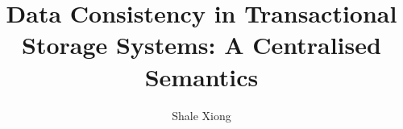 \documentclass[a4paper,UKenglish,cleveref,autoref,thm-restate,authorcolumns,anonymous]{lipics-v2019}
\title{%
Data Consistency in Transactional Storage Systems: 
A Centralised Semantics%
}
\author{Shale Xiong}{Arm research, UK}{shale.xiong@arm.com}{[orcid]}{[funding]}
\newcommand{\RootPath}{.}
\begin{document}
\maketitle

\begin{abstract}

\end{abstract}






%






\newpage
\onecolumn
\appendix

%

\end{document}
